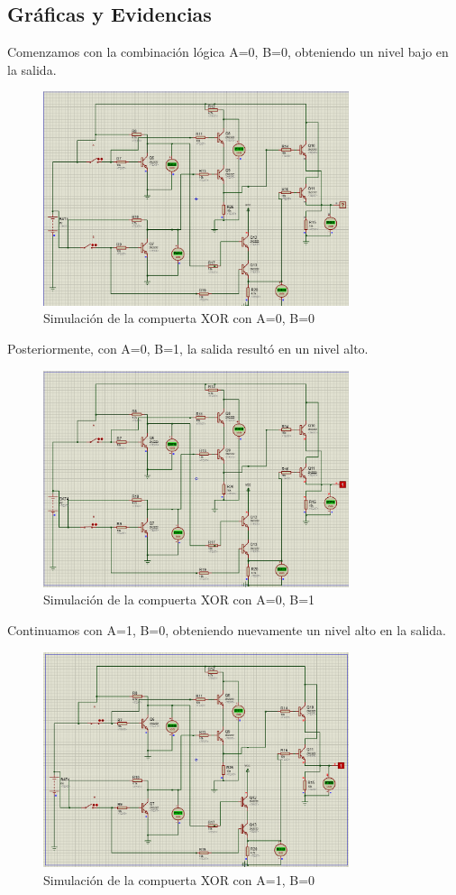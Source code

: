 \documentclass{article}
\begin{document}
\subsection{Gráficas y Evidencias}
Comenzamos con la combinación lógica A=0, B=0, obteniendo un nivel bajo en la salida. 
\begin{figure}[H]
\centering
\includegraphics[width=0.8\textwidth]{IMG/00.png}
\caption{Simulación de la compuerta XOR con A=0, B=0}
\label{fig:simulacion_a0b0}
\end{figure}
Posteriormente, con A=0, B=1, la salida resultó en un nivel alto.
\begin{figure}[H]
\centering 
\includegraphics[width=0.8\textwidth]{IMG/01.png}
\caption{Simulación de la compuerta XOR con A=0, B=1}
\label{fig:simulacion_a0b1}
\end{figure}
Continuamos con A=1, B=0, obteniendo nuevamente un nivel alto en la salida.
\begin{figure}[H]
\centering
\includegraphics[width=0.8\textwidth]{IMG/10.png}
\caption{Simulación de la compuerta XOR con A=1, B=0}
\label{fig:simulacion_a1b0}
\end{figure}
\end{document}
